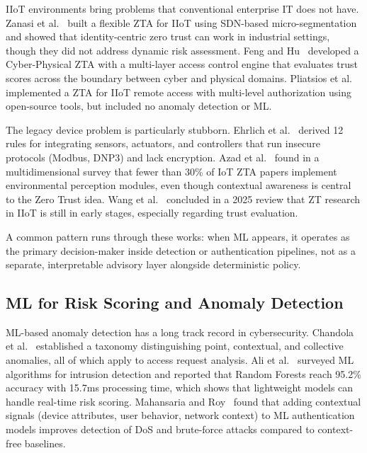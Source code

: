 \documentclass[conference]{IEEEtran}
\begin{document}
IIoT environments bring problems that conventional enterprise IT does not have. Zanasi et al.~\cite{zanasi2024} built a flexible ZTA for IIoT using SDN-based micro-segmentation and showed that identity-centric zero trust can work in industrial settings, though they did not address dynamic risk assessment. Feng and Hu~\cite{feng2023} developed a Cyber-Physical ZTA with a multi-layer access control engine that evaluates trust scores across the boundary between cyber and physical domains. Pliatsios et al.~\cite{pliatsios2023} implemented a ZTA for IIoT remote access with multi-level authorization using open-source tools, but included no anomaly detection or ML.

The legacy device problem is particularly stubborn. Ehrlich et al.~\cite{ehrlich2021} derived 12 rules for integrating sensors, actuators, and controllers that run insecure protocols (Modbus, DNP3) and lack encryption. Azad et al.~\cite{azad2024} found in a multidimensional survey that fewer than 30\% of IoT ZTA papers implement environmental perception modules, even though contextual awareness is central to the Zero Trust idea. Wang et al.~\cite{wangzt2025} concluded in a 2025 review that ZT research in IIoT is still in early stages, especially regarding trust evaluation.

A common pattern runs through these works: when ML appears, it operates as the primary decision-maker inside detection or authentication pipelines, not as a separate, interpretable advisory layer alongside deterministic policy.

\subsection{ML for Risk Scoring and Anomaly Detection}

ML-based anomaly detection has a long track record in cybersecurity. Chandola et al.~\cite{chandola2009} established a taxonomy distinguishing point, contextual, and collective anomalies, all of which apply to access request analysis. Ali et al.~\cite{ali2024} surveyed ML algorithms for intrusion detection and reported that Random Forests reach 95.2\% accuracy with 15.7ms processing time, which shows that lightweight models can handle real-time risk scoring. Mahansaria and Roy~\cite{mahansaria2024} found that adding contextual signals (device attributes, user behavior, network context) to ML authentication models improves detection of DoS and brute-force attacks compared to context-free baselines.
\end{document}
